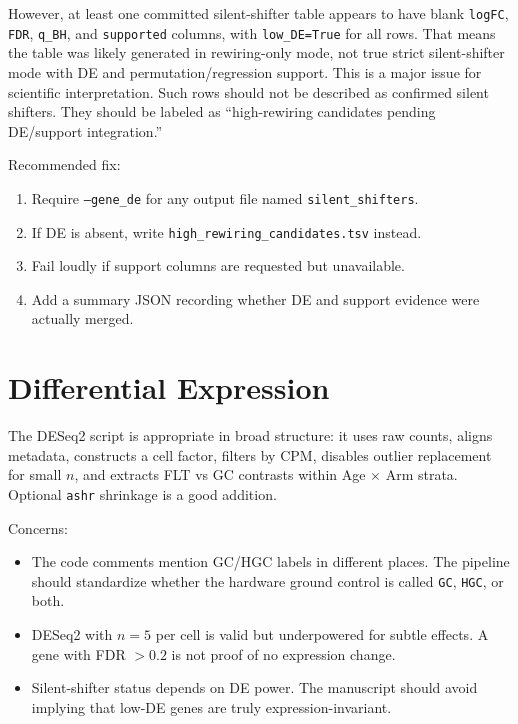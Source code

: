 \documentclass[11pt]{article}
\begin{document}
However, at least one committed silent-shifter table appears to have blank \texttt{logFC}, \texttt{FDR}, \texttt{q\_BH}, and \texttt{supported} columns, with \texttt{low\_DE=True} for all rows.  That means the table was likely generated in rewiring-only mode, not true strict silent-shifter mode with DE and permutation/regression support.  This is a major issue for scientific interpretation.  Such rows should not be described as confirmed silent shifters.  They should be labeled as ``high-rewiring candidates pending DE/support integration.''

Recommended fix:
\begin{enumerate}[leftmargin=1.5em]
    \item Require \texttt{--gene\_de} for any output file named \texttt{silent\_shifters}.
    \item If DE is absent, write \texttt{high\_rewiring\_candidates.tsv} instead.
    \item Fail loudly if support columns are requested but unavailable.
    \item Add a summary JSON recording whether DE and support evidence were actually merged.
\end{enumerate}

\section{Differential Expression}

The DESeq2 script is appropriate in broad structure: it uses raw counts, aligns metadata, constructs a cell factor, filters by CPM, disables outlier replacement for small $n$, and extracts FLT vs GC contrasts within Age $\times$ Arm strata.  Optional \texttt{ashr} shrinkage is a good addition.

Concerns:
\begin{itemize}[leftmargin=1.5em]
    \item The code comments mention GC/HGC labels in different places.  The pipeline should standardize whether the hardware ground control is called \texttt{GC}, \texttt{HGC}, or both.
    \item DESeq2 with $n=5$ per cell is valid but underpowered for subtle effects.  A gene with FDR $>0.2$ is not proof of no expression change.
    \item Silent-shifter status depends on DE power.  The manuscript should avoid implying that low-DE genes are truly expression-invariant.
\end{itemize}
\end{document}
